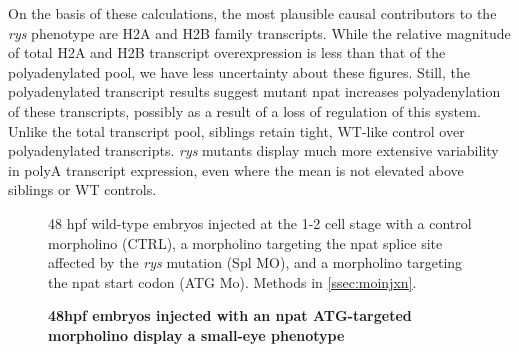 \documentclass{ut-thesis}
\begin{document}
\begin{NoHyper}
On the basis of these calculations, the most plausible causal contributors to the \textit{rys} phenotype are H2A and H2B family transcripts. While the relative magnitude of total H2A and H2B transcript overexpression is less than that of the polyadenylated pool, we have less uncertainty about these figures. Still, the polyadenylated transcript results suggest mutant npat increases polyadenylation of these transcripts, possibly as a result of a loss of regulation of this system. Unlike the total transcript pool, siblings retain tight, WT-like control over polyadenylated transcripts. \textit{rys} mutants display much more extensive variability in polyA transcript expression, even where the mean is not elevated above siblings or WT controls.

\begin{figure}[!h]
    \caption{{\bf 48hpf embryos injected with an npat ATG-targeted morpholino display a small-eye phenotype}}
    48 hpf wild-type embryos injected at the 1-2 cell stage with a control morpholino (CTRL), a morpholino targeting the npat splice site affected by the \textit{rys} mutation (Spl MO), and a morpholino targeting the npat start codon (ATG Mo).
    Methods in \autoref{ssec:moinjxn}.
    \label{morpholinopics}
\end{figure}


\end{NoHyper}
\end{document}
